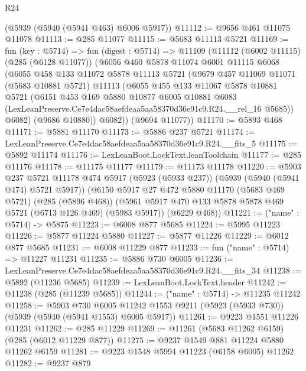 \begin{lexlean}{R24}
\begin{coremodule}
    (@5939 (@5940 (@5941 @463) @6006 @5917))
@11112 := @9656 @461 @11075 @11078
@11113 := @285 @11077
@11115 := @5683 @11113 @5721
@11169 := fun (key : @5714) =>
  fun (digest : @5714) =>
  @11109
    (@11112
      (@6002 @11115)
      (@285 (@6128 @11077))
      (@6056
        @460
        @5878
        @11074
        @6001
        @11115
        @6068
        (@6055
          @458
          @133
          @11072
          @5878
          @11113
          @5721
          (@9679
            @457
            @11069
            @11071
            (@5683 @10881 @5721)
            @11113
            (@6055
              @455
              @133
              @11067
              @5878
              @10881
              @5721
              (@6151
                @453
                @169
                @5880
                @10877
                @6005
                @10881
                @6083
                (LexLeanPreserve.Ce7e4dac58aefdeaa5aa58370d36e91c9.R24.__rel_16 @5685))
              @6082)
            (@9686 @10880))
          @6082))
      (@9694 @11077))
@11170 := @5893 @468
@11171 := @5881 @11170
@11173 := @5886 @237 @5721
@11174 := LexLeanPreserve.Ce7e4dac58aefdeaa5aa58370d36e91c9.R24.__fits_5
@11175 := @5892 @11174
@11176 := LexLeanBoot.LockText.leanToolchain
@11177 := @285 @11176
@11178 := @11175 @11177
@11179 := @11173 @11178
@11220 := @5903
    @237
    @5721
    @11178
    @474
    @5917
    (@5923 (@5933 @237))
    (@5939 (@5940 (@5941 @474) @5721 @5917))
    (@6150
      @5917
      @27
      @472
      @5880
      @11170
      (@5683 @469 @5721)
      (@285 (@5896 @468))
      (@5961 @5917 @470 @133 @5878 @5878 @469 @5721 (@6713 @126 @469) (@5983 @5917))
      (@6229 @468))
@11221 := ("name" : @5714) -> @5875
@11223 := @6008 @877 @5685
@11224 := @5995 @11223
@11226 := @5877 @11224 @5880
@11227 := @5877 @11226
@11229 := @6012 @877 @5685
@11231 := @6008 @11229 @877
@11233 := fun ("name" : @5714) => @11227 @11231
@11235 := @5886 @730 @6005
@11236 := LexLeanPreserve.Ce7e4dac58aefdeaa5aa58370d36e91c9.R24.__fits_34
@11238 := @5892 (@11236 @5685)
@11239 := LexLeanBoot.LockText.header
@11242 := @11238 (@285 (@11239 @5685))
@11244 := ("name" : @5714) -> @11235 @11242
@11258 := @5903
    @730
    @6005
    @11242
    @1553
    @9211
    (@5923 (@5933 @730))
    (@5939 (@5940 (@5941 @1553) @6005 @5917))
@11261 := @9223 @1551 @11226 @11231
@11262 := @285 @11229
@11269 := @11261 (@5683 @11262 @6159) (@285 (@6012 @11229 @877))
@11275 := @9237 @1549 @881 @11224 @5880 @11262 @6159
@11281 := @9223 @1548 @5994 @11223 (@6158 @6005) @11262
@11282 := @9237 @879

\end{coremodule}
\end{lexlean}
